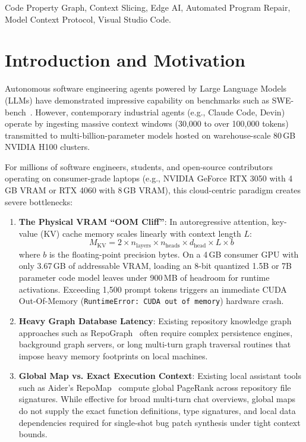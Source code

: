 \documentclass[10pt, conference]{IEEEtran}
\begin{document}
\begin{IEEEkeywords}
Code Property Graph, Context Slicing, Edge AI, Automated Program Repair, Model Context Protocol, Visual Studio Code.
\end{IEEEkeywords}

\section{Introduction and Motivation}

Autonomous software engineering agents powered by Large Language Models (LLMs) have demonstrated impressive capability on benchmarks such as SWE-bench~\cite{jimenez2024swebench}. However, contemporary industrial agents (e.g., Claude Code, Devin) operate by ingesting massive context windows (30,000 to over 100,000 tokens) transmitted to multi-billion-parameter models hosted on warehouse-scale 80\,GB NVIDIA H100 clusters. 

For millions of software engineers, students, and open-source contributors operating on consumer-grade laptops (e.g., NVIDIA GeForce RTX 3050 with 4\,GB VRAM or RTX 4060 with 8\,GB VRAM), this cloud-centric paradigm creates severe bottlenecks:
\begin{enumerate}
    \item \textbf{The Physical VRAM ``OOM Cliff''}: In autoregressive attention, key-value (KV) cache memory scales linearly with context length $L$:
    \begin{equation}
        M_{\text{KV}} = 2 \times n_{\text{layers}} \times n_{\text{heads}} \times d_{\text{head}} \times L \times b
    \end{equation}
    where $b$ is the floating-point precision bytes. On a 4\,GB consumer GPU with only 3.67\,GB of addressable VRAM, loading an 8-bit quantized 1.5B or 7B parameter code model leaves under 900\,MB of headroom for runtime activations. Exceeding 1,500 prompt tokens triggers an immediate CUDA Out-Of-Memory (\texttt{RuntimeError: CUDA out of memory}) hardware crash.
    \item \textbf{Heavy Graph Database Latency}: Existing repository knowledge graph approaches such as RepoGraph~\cite{ouyang2025repograph} often require complex persistence engines, background graph servers, or long multi-turn graph traversal routines that impose heavy memory footprints on local machines.
    \item \textbf{Global Map vs. Exact Execution Context}: Existing local assistant tools such as Aider's RepoMap~\cite{gausemeier2024aider} compute global PageRank across repository file signatures. While effective for broad multi-turn chat overviews, global maps do not supply the exact function definitions, type signatures, and local data dependencies required for single-shot bug patch synthesis under tight context bounds.
\end{enumerate}
\end{document}
